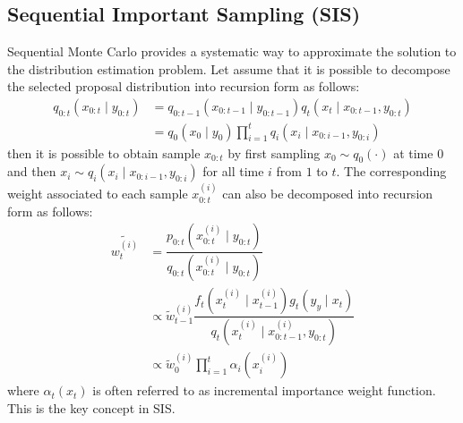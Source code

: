 \subsection{Sequential Important Sampling (SIS)}
\label{sec:SIS}
Sequential Monte Carlo provides a systematic way to approximate the solution to the distribution estimation problem. Let assume that it is possible to decompose the selected proposal distribution into recursion form as follows:
\begin{align}
	q_{0:t}(x_{0:t} \mid y_{0:t}) &= q_{0:t-1}(x_{0:t-1} \mid y_{0:t-1}) q_t(x_t \mid x_{0:t-1}, y_{0:t}) \nonumber \\
	             &= q_0(x_0 \mid y_0) \prod^t_{i=1} q_i(x_i \mid x_{0:i-1}, y_{0:i})
\label{eq:q}
\end{align}
then it is possible to obtain sample ${x_{0:t}}$ by first sampling $x_0 \sim q_0(\cdot)$ at time $0$ and then $x_i \sim q_i(x_i \mid x_{0:i-1}, y_{0:i})$ for all time $i$ from $1$ to $t$. The corresponding weight associated to each sample $x^{(i)}_{0:t}$ can also be decomposed into recursion form as follows:
\begin{align}
  \tilde{w^{(i)}_t} &= \dfrac{p_{0:t}(x^{(i)}_{0:t} \mid y_{0:t})}{q_{0:t}(x^{(i)}_{0:t} \mid y_{0:t})} \nonumber \\
              &\propto \tilde{w}^{(i)}_{t-1} \dfrac{f_t(x^{(i)}_t \mid x^{(i)}_{t-1})g_t(y_y \mid x_t)}{q_t(x^{(i)}_t \mid x^{(i)}_{0:t-1}, y_{0:t})} \label{eq:w} \\
              &\propto \tilde{w}^{(i)}_0 \prod^t_{i=1} \alpha_i(x^{(i)}_{i})          
\end{align}
where $\alpha_t(x_{t})$  is often referred to as incremental importance weight function. This is the key concept in SIS.

